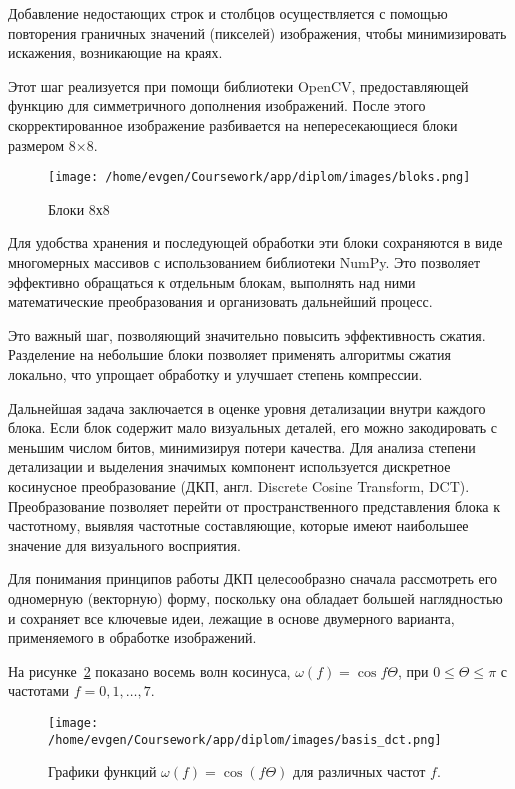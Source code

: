 Добавление недостающих строк и столбцов осуществляется с помощью повторения граничных значений (пикселей) изображения, 
чтобы минимизировать искажения, возникающие на краях. 

\AddedBlocks

Этот шаг реализуется при помощи библиотеки OpenCV, предоставляющей функцию для симметричного дополнения изображений. 
После этого скорректированное изображение разбивается на непересекающиеся блоки размером 8×8.

\begin{figure}[H]
    \centering
    \texttt{[image: /home/evgen/Coursework/app/diplom/images/bloks.png]}
    \caption{Блоки 8х8}
    \label{fig:blocks}
\end{figure}


Для удобства хранения и последующей обработки эти блоки сохраняются в виде многомерных массивов с использованием библиотеки NumPy. 
Это позволяет эффективно обращаться к отдельным блокам, выполнять над ними математические преобразования и организовать дальнейший процесс.


Это важный шаг, позволяющий значительно повысить эффективность сжатия. 
Разделение на небольшие блоки позволяет применять алгоритмы сжатия локально, что упрощает обработку и улучшает степень компрессии.

Дальнейшая задача заключается в оценке уровня детализации внутри каждого блока. 
Если блок содержит мало визуальных деталей, его можно закодировать с меньшим числом битов, минимизируя потери качества. 
Для анализа степени детализации и выделения значимых компонент используется дискретное косинусное преобразование (ДКП, англ. Discrete Cosine Transform, DCT). 
Преобразование позволяет перейти от пространственного представления блока к частотному, выявляя частотные составляющие, которые имеют наибольшее значение для визуального восприятия.

Для понимания принципов работы ДКП целесообразно сначала рассмотреть его одномерную (векторную) форму, 
поскольку она обладает большей наглядностью и сохраняет все ключевые идеи, лежащие в основе двумерного варианта, применяемого в обработке изображений.


На рисунке~\ref{fig:coswaves}  показано восемь волн косинуса, $\omega(f) = \cos{f \Theta}$, при $0 \leq \Theta \leq \pi$ с частотами $f=0,1,\ldots,7$.

\begin{figure}[h!]
    \centering
    \texttt{[image: /home/evgen/Coursework/app/diplom/images/basis\_dct.png]}
    \caption{Графики функций $\omega(f) = \cos{(f \Theta)}$ для различных частот $f$.}
    \label{fig:coswaves}
\end{figure}

